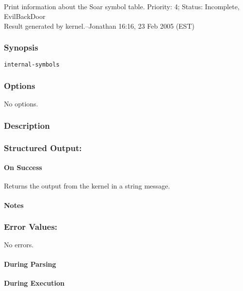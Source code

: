 \subsection{}
\label{internal-symbols}
Print information about the Soar symbol table. 
 Priority: 4; Status: Incomplete, EvilBackDoor\\ 
Result generated by kernel.--Jonathan 16:16, 23 Feb 2005 (EST) 
\subsubsection*{Synopsis}
\begin{verbatim}
internal-symbols
\end{verbatim}
\subsubsection*{Options}
 No options. 
\subsubsection*{Description}
\subsubsection*{Structured Output:}
\paragraph*{On Success}
 Returns the output from the kernel in a string message. 
\paragraph*{Notes}
\subsubsection*{Error Values:}
 No errors. 
\paragraph*{During Parsing}
\paragraph*{During Execution}
